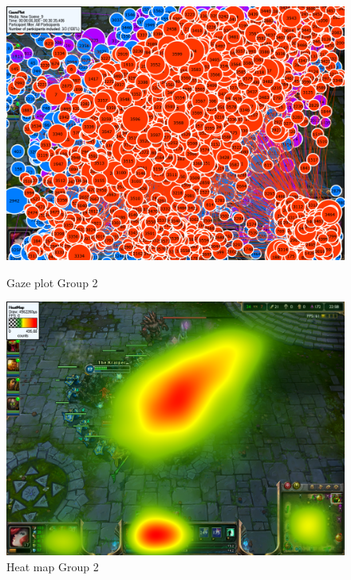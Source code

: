 \documentclass{report}
\begin{document}
\begin{figure}[ht]
\begin{minipage}[b]{0.45\linewidth}
\centering
\includegraphics[width=\textwidth]{images/gazeplot/Pros}
\caption{Gaze plot Group 2}
\label{gaze_pro}
\end{minipage}
\hspace{0.5cm}
\begin{minipage}[b]{0.45\linewidth}
\centering
\includegraphics[width=\textwidth]{images/heatmap/Pros}
\caption{Heat map Group 2}
\label{heat_pro}
\end{minipage}
\end{figure}
\end{document}
